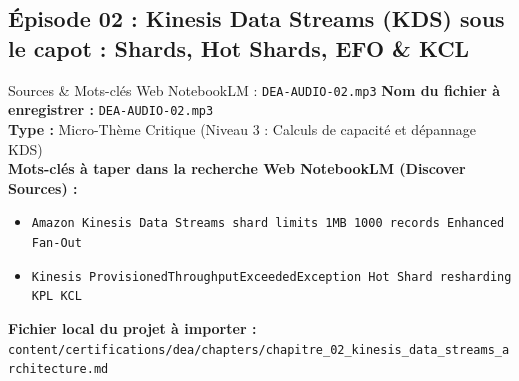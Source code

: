 \documentclass[11pt,a4paper]{article}
\begin{document}
\subsection{Épisode 02 : Kinesis Data Streams (KDS) sous le capot : Shards, Hot Shards, EFO \& KCL}
\begin{sourcebox}{Sources \& Mots-clés Web NotebookLM : \texttt{DEA-AUDIO-02.mp3}}
\textbf{Nom du fichier à enregistrer :} \texttt{DEA-AUDIO-02.mp3}\\
\textbf{Type :} Micro-Thème Critique (Niveau 3 : Calculs de capacité et dépannage KDS)\\
\textbf{Mots-clés à taper dans la recherche Web NotebookLM (Discover Sources) :}
\begin{itemize}[noitemsep]
    \item \texttt{Amazon Kinesis Data Streams shard limits 1MB 1000 records Enhanced Fan-Out}
    \item \texttt{Kinesis ProvisionedThroughputExceededException Hot Shard resharding KPL KCL}
\end{itemize}
\textbf{Fichier local du projet à importer :}
\texttt{content/certifications/dea/chapters/chapitre_02_kinesis_data_streams_architecture.md}
\end{sourcebox}
\end{document}
